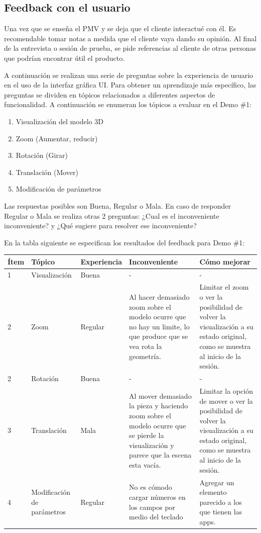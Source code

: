 \subsection{Feedback con el usuario}
Una vez que se enseña el PMV y se deja que el cliente interactué con él. Es recomendable tomar notas a medida que el cliente vaya dando su opinión. Al final de la entrevista o sesión de prueba, se pide referencias al cliente de otras personas que podrían encontrar útil el producto.

A continuación se realizan una serie de preguntas sobre la experiencia de usuario en el uso de la interfaz gráfica UI. 
Para obtener un aprendizaje más específico, las preguntas se dividen en tópicos relacionados a diferentes aspectos de funcionalidad. A continuación se enumeran los tópicos a evaluar en el Demo \#1:
\begin{enumerate}
    \item Visualización del modelo 3D
    \item Zoom (Aumentar, reducir)
    \item Rotación (Girar)
    \item Translación (Mover)
    \item Modificación de parámetros
\end{enumerate}
Las respuestas posibles son Buena, Regular o Mala. En caso de responder Regular o Mala se realiza otras 2 preguntas: ¿Cual es el inconveniente inconveniente? y ¿Qué sugiere para resolver ese inconveniente?

En la tabla siguiente se especifican los resultados del feedback para Demo \#1:


\begin{tabular}{ |p{0.8cm}|p{2.3cm}|p{2.2cm}|p{3.6cm}|p{3.6cm}| }
\hline
     Ítem & Tópico & Experiencia  & Inconveniente & Cómo mejorar\\
\hline
1 & Visualización & Buena & - & -\\
\hline
2 & Zoom & Regular & Al hacer demasiado zoom sobre el modelo ocurre que no hay un limite, lo que produce que se vea rota la geometría. & Limitar el zoom o ver la posibilidad de volver la visualización a su estado original, como se muestra al inicio de la sesión.\\
\hline
2 & Rotación & Buena & - & -\\
\hline
3 & Translación & Mala & Al mover demasiado la pieza y haciendo zoom sobre el modelo ocurre que se pierde la visualización y parece que la escena esta vacía. & Limitar la opción de mover o ver la posibilidad de volver la visualización a su estado original, como se muestra al inicio de la sesión.\\
\hline
4 & Modificación de parámetros & Regular & No es cómodo cargar números en los campos por medio del teclado & Agregar un elemento parecido a los que tienen las apps.\\
\hline
\end{tabular}

